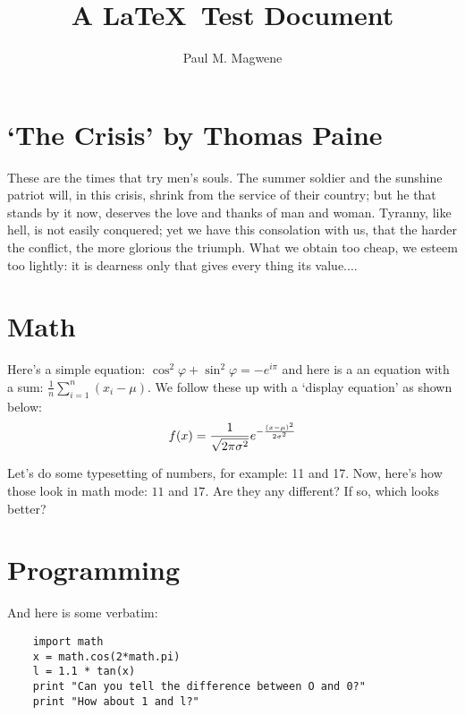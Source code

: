 
\newcommand{\normdistn}{\ensuremath{%
f(x) = 
\frac{1}{\sqrt{2\pi\sigma^2}} e^{-\frac{(x-\mu)^2}{2\sigma^2}}
}}

\newcommand{\varx}{\ensuremath{\frac{1}{n}\sum_{i=1}^{n}(x_i-\mu)}}


\title{A \LaTeX\ Test Document}
\author{Paul M. Magwene}


\maketitle
    
\section{`The Crisis' by Thomas Paine}

These are the times that try men's souls. The summer soldier and the sunshine patriot will, in this crisis, shrink from the service of their country; but he that stands by it now, deserves the love and thanks of man and woman. Tyranny, like hell, is not easily conquered; yet we have this consolation with us, that the harder the conflict, the more glorious the triumph. What we obtain too cheap, we esteem too lightly: it is dearness only that gives every thing its value....


\section{Math}

Here's a simple equation: $\cos^2 \varphi + \sin^2 \varphi = -e^{i\pi}$ and here is a an equation with a sum: \varx. We follow these up with a `display equation' as shown below:
\[
\normdistn
\]

Let's do some typesetting of numbers, for example: 11 and 17. Now, here's how those look in math mode: $11$ and $17$. Are they any different? If so, which looks better?

\section{Programming}

And here is some verbatim:
\begin{verbatim}
    import math
    x = math.cos(2*math.pi)
    l = 1.1 * tan(x)
    print "Can you tell the difference between O and 0?"
    print "How about 1 and l?"
\end{verbatim}  
    
